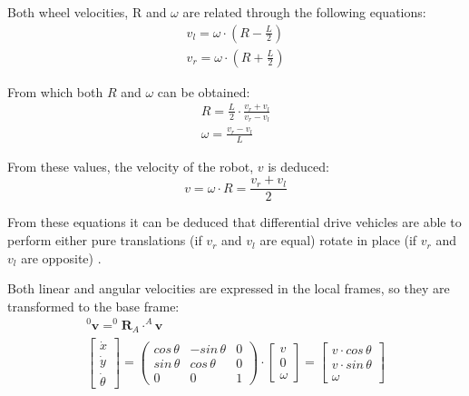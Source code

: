 Both wheel velocities, R and $\omega$ are related through the following equations:
\begin{gather}
  v_l = \omega\cdot(R-\frac{L}{2})\\
  v_r = \omega\cdot(R+\frac{L}{2})
  \label{eq:vrl}
\end{gather} 

From which both $R$ and $\omega$ can be obtained:
\begin{gather}
  R = \frac{L}{2}\cdot\frac{v_r + v_l}{v_r - v_l}\\
  \omega = \frac{v_r - v_l}{L}
  \label{eq:Rw}
\end{gather}  

From these values, the velocity of the robot, $v$ is deduced:
\begin{equation}
  v = \omega \cdot R = \frac{v_r + v_l}{2} 
  \label{eq:v}
\end{equation}

From these equations it can be deduced that differential drive vehicles are able to perform either pure translations (if $v_r$ and $v_l$ are equal) rotate in place (if $v_r$ and $v_l$ are opposite) .

Both linear and angular velocities are expressed in the local frames, so they are transformed to the base frame:
\begin{gather}
  ^{0}\mathbf{v} = ^{0}\!\!\mathbf{R}_A\cdot^{A}\!\mathbf{v} \label{eq:traf} \\
\begin{bmatrix} \dot{x} \\ \dot{y} \\ \dot{\theta} \end{bmatrix} = 
  \begin{pmatrix} cos\,\theta & -sin\,\theta & 0 \\ sin\,\theta & cos\,\theta & 0 \\ 0 & 0 & 1 \end{pmatrix} \cdot \begin{bmatrix} v \\ 0 \\ \omega \end{bmatrix} = 
  \begin{bmatrix} v\cdot cos\,\theta \\ v\cdot sin\,\theta \\ \omega \end{bmatrix}
    \label{eq:vwtraf}
\end{gather}  

